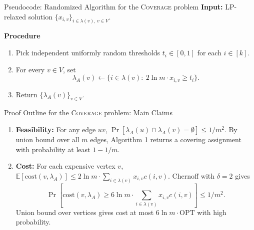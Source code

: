 \documentclass[aspectratio=169]{beamer}
\newcommand{\coverage}{\textsc{Coverage}\xspace}
\newcommand{\OPT}{\mathrm{OPT}}
\begin{document}
\begin{frame}{Pseudocode: Randomized Algorithm for the \coverage problem}
  \textbf{Input:} LP-relaxed solution $\{x_{i,v}\}_{i\in\lambda(v),\,v\in V}$.

  \vspace{0.4em}
  \textbf{Procedure}
  \begin{enumerate}
    \item Pick independent uniformly random thresholds $t_i\in[0,1]$ for each $i\in[k]$.
    \pause
    \item For every $v\in V$, set
    \[
      \lambda_A(v) \gets \{i\in\lambda(v):\ 2\ln m\cdot x_{i,v} \ge t_i\}.
    \]
    \pause
    \item Return $\{\lambda_A(v)\}_{v\in V}$.
  \end{enumerate}
\end{frame}


\begin{frame}{Proof Outline for the \coverage problem: Main Claims}
  \begin{enumerate}
    \item \textbf{Feasibility:} For any edge $uv$, $\Pr[\lambda_A(u)\cap\lambda_A(v)=\emptyset]\le 1/m^2$.
    By union bound over all $m$ edges, Algorithm 1 returns a covering assignment with probability at least $1-1/m$.
    \pause
    \item \textbf{Cost:} 
    For each expensive vertex $v$, $\mathbb{E}[\mathrm{cost}(v,\lambda_A)]\le 2\ln m\cdot \sum_{i\in\lambda(v)}x_{i,v}c(i,v)$.
    Chernoff with $\delta=2$ gives
    \[
      \Pr\!\left[\mathrm{cost}(v,\lambda_A)\ge 6\ln m\cdot\sum_{i\in\lambda(v)}x_{i,v}c(i,v)\right]\le 1/m^2.
    \]
    Union bound over vertices gives cost at most $6\ln m\cdot\OPT$ with high probability.
  \end{enumerate}
\end{frame}
\end{document}
